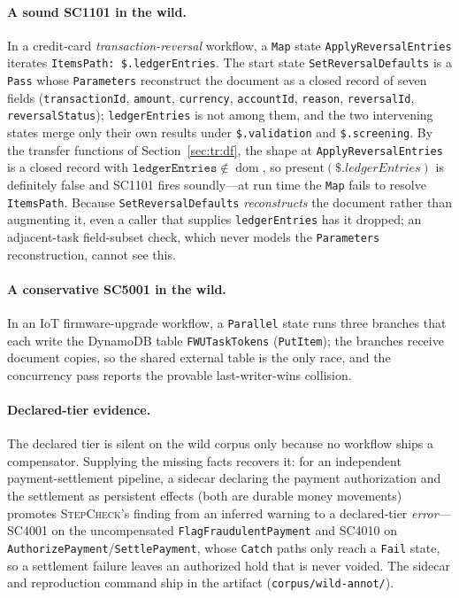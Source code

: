 \documentclass[11pt]{article}
\newcommand{\code}[1]{\textsf{\small #1}}
\newcommand{\tool}{\textsc{StepCheck}}
\newcommand{\dom}{\operatorname{dom}}
\theoremstyle{plain}
\theoremstyle{definition}
\theoremstyle{remark}
\begin{document}
\paragraph{A sound \code{SC1101} in the wild.} In a credit-card \emph{transaction-reversal} workflow,
a \texttt{Map} state \texttt{ApplyReversalEntries} iterates \texttt{ItemsPath: \$.ledgerEntries}. The
start state \texttt{SetReversalDefaults} is a \texttt{Pass} whose \texttt{Parameters} reconstruct the
document as a closed record of seven fields (\texttt{transactionId}, \texttt{amount},
\texttt{currency}, \texttt{accountId}, \texttt{reason}, \texttt{reversalId}, \texttt{reversalStatus});
\texttt{ledgerEntries} is not among them, and the two intervening states merge only their own results
under \texttt{\$.validation} and \texttt{\$.screening}. By the transfer functions of
Section~\ref{sec:tr:df}, the shape at \texttt{ApplyReversalEntries} is a closed record with
$\texttt{ledgerEntries}\notin\dom$, so $\mathrm{present}(\$.ledgerEntries)$ is definitely false and
\code{SC1101} fires soundly---at run time the \texttt{Map} fails to resolve \texttt{ItemsPath}.
Because \texttt{SetReversalDefaults} \emph{reconstructs} the document rather than augmenting it, even
a caller that supplies \texttt{ledgerEntries} has it dropped; an adjacent-task field-subset check,
which never models the \texttt{Parameters} reconstruction, cannot see this.

\paragraph{A conservative \code{SC5001} in the wild.} In an IoT firmware-upgrade workflow, a
\texttt{Parallel} state runs three branches that each write the DynamoDB table \texttt{FWUTaskTokens}
(\texttt{PutItem}); the branches receive document copies, so the shared external table is the only
race, and the concurrency pass reports the provable last-writer-wins collision.

\paragraph{Declared-tier evidence.} The declared tier is silent on the wild corpus only because no
workflow ships a compensator. Supplying the missing facts recovers it: for an independent
payment-settlement pipeline, a sidecar declaring the payment authorization and the settlement as
persistent effects (both are durable money movements) promotes \tool{}'s finding from an inferred
warning to a declared-tier \emph{error}---\code{SC4001} on the uncompensated \texttt{FlagFraudulentPayment}
and \code{SC4010} on \texttt{AuthorizePayment}/\texttt{SettlePayment}, whose \texttt{Catch} paths only
reach a \texttt{Fail} state, so a settlement failure leaves an authorized hold that is never voided.
The sidecar and reproduction command ship in the artifact (\texttt{corpus/wild-annot/}).
\end{document}
